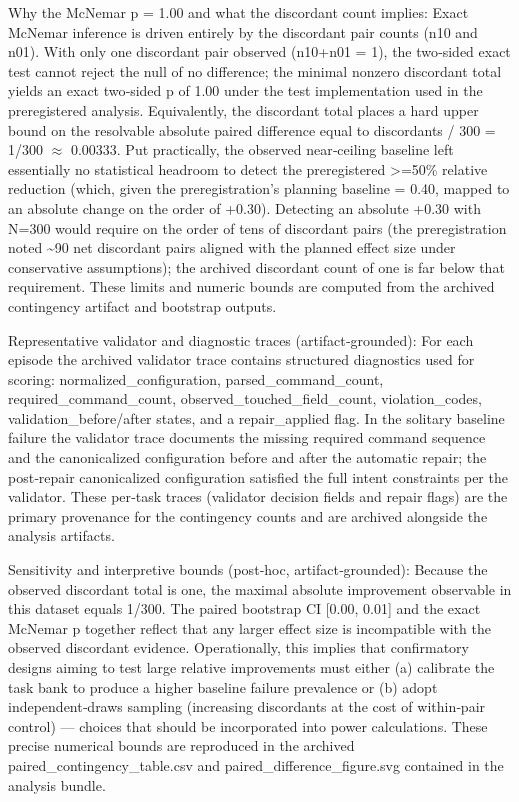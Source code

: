 \documentclass[conference]{IEEEtran}
\begin{document}
Why the McNemar p = 1.00 and what the discordant count implies: Exact McNemar inference is driven entirely by the discordant pair counts (n10 and n01). With only one discordant pair observed (n10+n01 = 1), the two‑sided exact test cannot reject the null of no difference; the minimal nonzero discordant total yields an exact two‑sided p of 1.00 under the test implementation used in the preregistered analysis. Equivalently, the discordant total places a hard upper bound on the resolvable absolute paired difference equal to discordants / 300 = 1/300 \ensuremath{\approx} 0.00333. Put practically, the observed near‑ceiling baseline left essentially no statistical headroom to detect the preregistered >=50\% relative reduction (which, given the preregistration's planning baseline = 0.40, mapped to an absolute change on the order of +0.30). Detecting an absolute +0.30 with N=300 would require on the order of tens of discordant pairs (the preregistration noted \textasciitilde{}90 net discordant pairs aligned with the planned effect size under conservative assumptions); the archived discordant count of one is far below that requirement. These limits and numeric bounds are computed from the archived contingency artifact and bootstrap outputs.

Representative validator and diagnostic traces (artifact‑grounded): For each episode the archived validator trace contains structured diagnostics used for scoring: normalized\_configuration, parsed\_command\_count, required\_command\_count, observed\_touched\_field\_count, violation\_codes, validation\_before/after states, and a repair\_applied flag. In the solitary baseline failure the validator trace documents the missing required command sequence and the canonicalized configuration before and after the automatic repair; the post‑repair canonicalized configuration satisfied the full intent constraints per the validator. These per‑task traces (validator decision fields and repair flags) are the primary provenance for the contingency counts and are archived alongside the analysis artifacts.

Sensitivity and interpretive bounds (post‑hoc, artifact‑grounded): Because the observed discordant total is one, the maximal absolute improvement observable in this dataset equals 1/300. The paired bootstrap CI [0.00, 0.01] and the exact McNemar p together reflect that any larger effect size is incompatible with the observed discordant evidence. Operationally, this implies that confirmatory designs aiming to test large relative improvements must either (a) calibrate the task bank to produce a higher baseline failure prevalence or (b) adopt independent‑draws sampling (increasing discordants at the cost of within‑pair control) --- choices that should be incorporated into power calculations. These precise numerical bounds are reproduced in the archived paired\_contingency\_table.csv and paired\_difference\_figure.svg contained in the analysis bundle.
\end{document}
